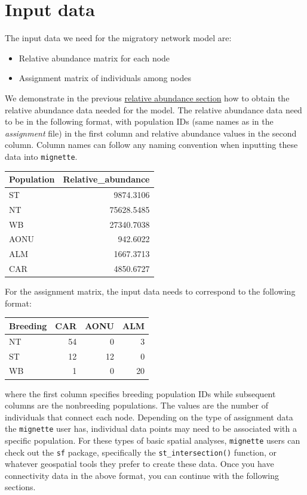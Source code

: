 \documentclass[
]{book}
\providecommand{\tightlist}{%
  \setlength{\itemsep}{0pt}\setlength{\parskip}{0pt}}
\begin{document}
\hypertarget{input-data}{%
\section{Input data}\label{input-data}}

The input data we need for the migratory network model are:

\begin{itemize}
\tightlist
\item
  Relative abundance matrix for each node
\item
  Assignment matrix of individuals among nodes
\end{itemize}

We demonstrate in the previous \protect\hyperlink{abundance}{relative abundance section} how to obtain the relative abundance data needed for the model. The relative abundance data need to be in the following format, with population IDs (same names as in the \emph{assignment} file) in the first column and relative abundance values in the second column. Column names can follow any naming convention when inputting these data into \texttt{mignette}.

\begin{tabular}{l|r}
\hline
Population & Relative\_abundance\\
\hline
ST & 9874.3106\\
\hline
NT & 75628.5485\\
\hline
WB & 27340.7038\\
\hline
AONU & 942.6022\\
\hline
ALM & 1667.3713\\
\hline
CAR & 4850.6727\\
\hline
\end{tabular}

For the assignment matrix, the input data needs to correspond to the following format:

\begin{tabular}{l|r|r|r}
\hline
Breeding & CAR & AONU & ALM\\
\hline
NT & 54 & 0 & 3\\
\hline
ST & 12 & 12 & 0\\
\hline
WB & 1 & 0 & 20\\
\hline
\end{tabular}

where the first column specifies breeding population IDs while subsequent columns are the nonbreeding populations. The values are the number of individuals that connect each node. Depending on the type of assignment data the \texttt{mignette} user has, individual data points may need to be associated with a specific population. For these types of basic spatial analyses, \texttt{mignette} users can check out the \texttt{sf} package, specifically the \texttt{st\_intersection()} function, or whatever geospatial tools they prefer to create these data. Once you have connectivity data in the above format, you can continue with the following sections.
\end{document}
